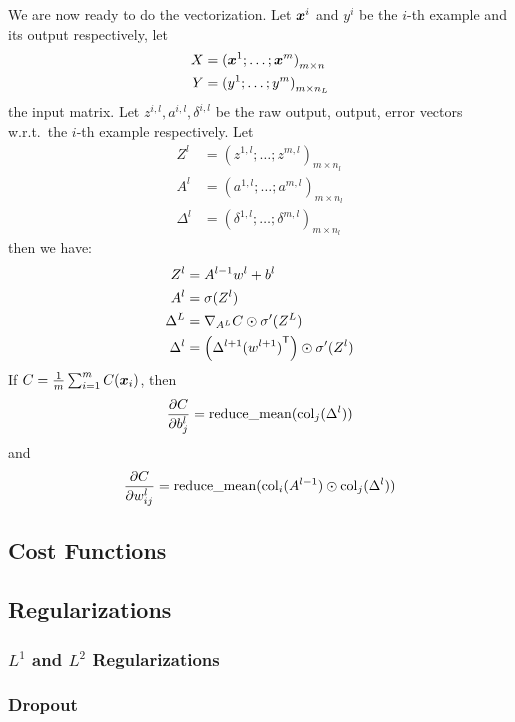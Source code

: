 We are now ready to do the vectorization. Let $\boldsymbol{x}^i$ and $y^i$
be the $i$-th example and its output respectively, let
\begin{align*}
    X &= {(\boldsymbol{x}^1; \ldots; \boldsymbol{x}^m)}_{m \times n}\\
    Y &= {(y^1; \ldots; y^m)}_{m \times n_L}
\end{align*}
the input matrix. 
Let $z^{i, l}, a^{i, l}, \delta^{i, l}$ be the raw output, output, error vectors w.r.t.\ the
$i$-th example respectively. Let 
\begin{align*}
    Z^l &= {(z^{1, l}; \ldots; z^{m, l})}_{m \times n_l}\\
    A^l &= {(a^{1, l}; \ldots; a^{m, l})}_{m \times n_l}\\
    \Delta^l &= {(\delta^{1, l}; \ldots; \delta^{m, l})}_{m \times n_l}
\end{align*}
then we have:
\begin{align}
    Z^l &= A^{l-1} w^l + b^l\\
    A^l &= \sigma(Z^l)\\
    \Delta^L &= \nabla_{A^L}C \odot \sigma'(Z^L)\\
    \Delta^l &= \left(\Delta^{l+1} {(w^{l+1})}^\mathsf{T}\right) \odot \sigma'(Z^l)
\end{align}
If $C = \frac{1}{m}\sum_{i=1}^m C(\boldsymbol{x}_i)$, then
$$\frac{\partial {C}}{\partial {b^l_j}} = \operatorname{reduce\_mean}(\operatorname{col}_j(\Delta^l))$$
and
$$\frac{\partial {C}}{\partial {w^l_{ij}}} = \operatorname{reduce\_mean}(\operatorname{col}_i(A^{l-1}) \odot \operatorname{col}_j
(\Delta^l))$$

\subsection{Cost Functions}


\subsection{Regularizations}
\subsubsection{$L^1$ and $L^2$ Regularizations}

\subsubsection{Dropout}